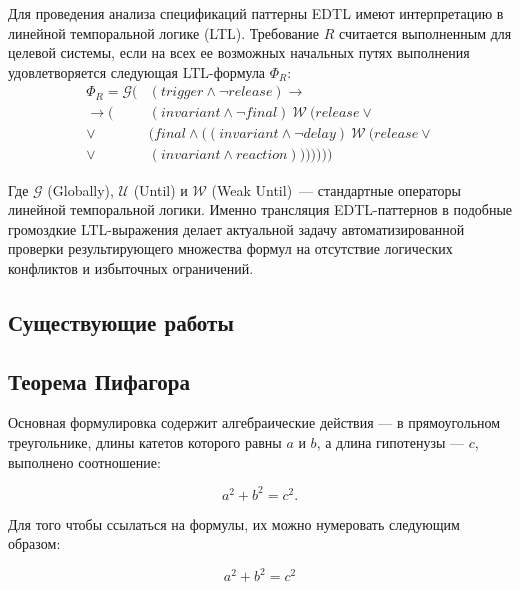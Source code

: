 Для проведения анализа спецификаций паттерны EDTL имеют интерпретацию в линейной темпоральной логике (LTL). Требование $R$ считается выполненным для целевой системы, если на всех ее возможных начальных путях выполнения удовлетворяется следующая LTL-формула $\Phi_{R}$:
\begin{equation}\label{eq:edtl2ltl}
\begin{split}
    \Phi_R = \mathcal{G} \Big( &(\mathit{trigger} \land \neg \mathit{release}) \to \\
    \to \big( &(\mathit{invariant} \land \neg \mathit{final}) \ \mathcal{W} \ (\mathit{release} \lor {}\\
    {} \lor &(\mathit{final} \land ((\mathit{invariant} \land \neg \mathit{delay}) \ \mathcal{W} \ (\mathit{release} \lor {}\\
    {} \lor &(\mathit{invariant} \land \mathit{reaction}))))) \big) \Big)
\end{split}
\end{equation}

Где $\mathcal{G}$ (Globally), $\mathcal{U}$ (Until) и $\mathcal{W}$ (Weak Until)~--- стандартные операторы линейной темпоральной логики. Именно трансляция EDTL-паттернов в подобные громоздкие LTL-выражения делает актуальной задачу автоматизированной проверки результирующего множества формул на отсутствие логических конфликтов и избыточных ограничений.
\subsection{Существующие работы}\label{sec:related-work}


\subsection{Теорема Пифагора}\label{sec:pythagoras}



Основная формулировка содержит алгебраические действия --- в
прямоугольном треугольнике, длины катетов которого равны \(a\) и \(b\),
а длина гипотенузы --- \(c\), выполнено соотношение:

\[
a^2 + b^2 = c^2.
\]

Для того чтобы ссылаться на формулы, их можно нумеровать следующим
образом:

\begin{equation}\label{eq:pythagoras}{
a^2 + b^2 = c^2
}\end{equation}

